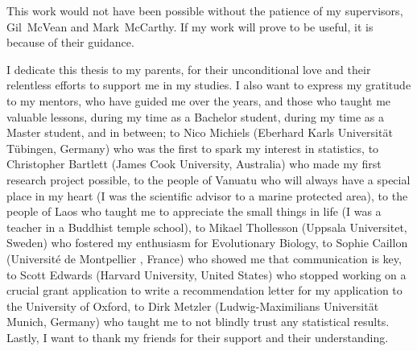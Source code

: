 


This work would not have been possible without the patience of my supervisors, Gil~McVean and Mark~McCarthy.
If my work will prove to be useful, it is because of their guidance.

I dedicate this thesis to my parents, for their unconditional love and their relentless efforts to support me in my studies.
I also want to express my gratitude to my mentors, who have guided me over the years, and those who taught me valuable lessons, during my time as a Bachelor student, during my time as a Master student, and in between;
to Nico Michiels (Eberhard Karls Universit\"at T\"ubingen, Germany) who was the first to spark my interest in statistics,
to Christopher Bartlett (James Cook University, Australia) who made my first research project possible,
to the people of Vanuatu who will always have a special place in my heart
(I was the scientific advisor to a marine protected area),
to the people of Laos who taught me to appreciate the small things in life
(I was a teacher in a Buddhist temple school),
to Mikael Thollesson (Uppsala Universitet, Sweden) who fostered my enthusiasm for Evolutionary Biology,
to Sophie Caillon (Universit\'e de Montpellier , France) who showed me that communication is key,
to Scott Edwards (Harvard University, United States) who stopped working on a crucial grant application
to write a recommendation letter for my application to the University of Oxford,
to Dirk Metzler (Ludwig-Maximilians Universit\"at Munich, Germany) who taught me to not blindly trust any statistical results.
Lastly, I want to thank my friends for their support and their understanding.





